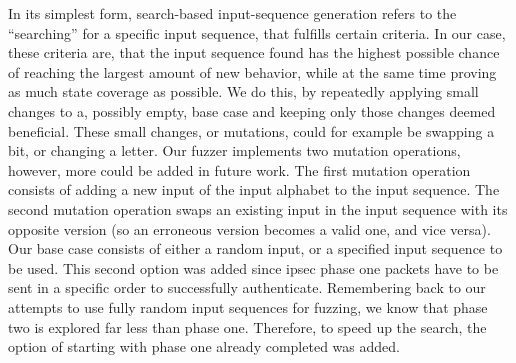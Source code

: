 In its simplest form, search-based input-sequence generation refers to the ``searching'' for a specific input sequence, that fulfills certain criteria. In our case, these criteria are, that the input sequence found has the highest possible chance of reaching the largest amount of new behavior, while at the same time proving as much state coverage as possible. We do this, by repeatedly applying small changes to a, possibly empty, base case and keeping only those changes deemed beneficial. These small changes, or mutations, could for example be swapping a bit, or changing a letter. Our fuzzer implements two mutation operations, however, more could be added in future work. The first mutation operation consists of adding a new input of the input alphabet to the input sequence. The second mutation operation swaps an existing input in the input sequence with its opposite version (so an erroneous version becomes a valid one, and vice versa). Our base case consists of either a random input, or a specified input sequence to be used. This second option was added since \ac{ipsec} phase one packets have to be sent in a specific order to successfully authenticate. Remembering back to our attempts to use fully random input sequences for fuzzing, we know that phase two is explored far less than phase one. Therefore, to speed up the search, the option of starting with phase one already completed was added.

